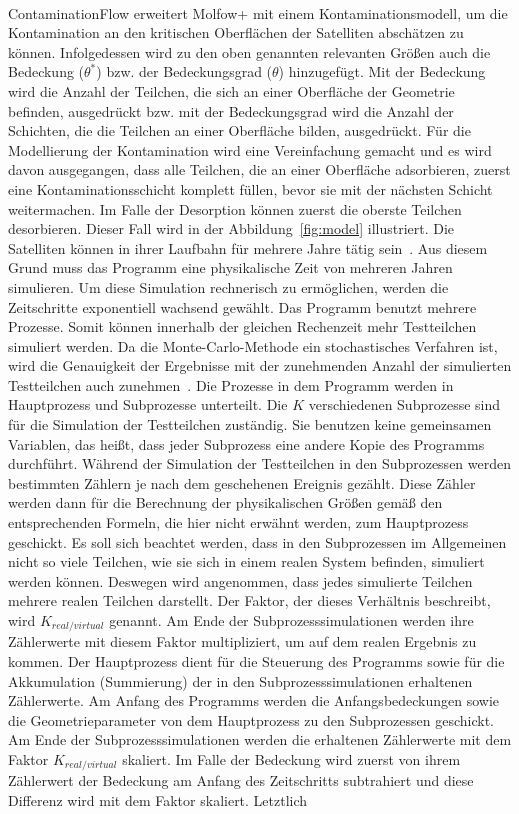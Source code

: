 \documentclass{listhesis}
\begin{document}
\paragraph{}
ContaminationFlow erweitert Molfow+ mit einem Kontaminationsmodell, um die Kontamination an den kritischen Oberflächen der Satelliten abschätzen zu können. Infolgedessen wird zu den oben genannten relevanten Größen auch die Bedeckung ($\theta^*$) bzw. der Bedeckungsgrad ($\theta$) hinzugefügt. Mit der Bedeckung wird die Anzahl der Teilchen, die sich an einer Oberfläche der Geometrie befinden, ausgedrückt bzw. mit der Bedeckungsgrad wird die Anzahl der Schichten, die die Teilchen an einer Oberfläche bilden, ausgedrückt. Für die Modellierung der Kontamination wird eine Vereinfachung gemacht und es wird davon ausgegangen, dass alle Teilchen, die an einer Oberfläche adsorbieren, zuerst eine Kontaminationsschicht komplett füllen, bevor sie mit der nächsten Schicht weitermachen. Im Falle der Desorption können zuerst die oberste Teilchen desorbieren. Dieser Fall wird in der Abbildung~\ref{fig:model} illustriert. Die Satelliten können in ihrer Laufbahn für mehrere Jahre tätig sein~\cite{jiao}. Aus diesem Grund muss das Programm eine physikalische Zeit von mehreren Jahren simulieren. Um diese Simulation rechnerisch zu ermöglichen, werden die Zeitschritte exponentiell wachsend gewählt. Das Programm benutzt mehrere Prozesse. Somit können innerhalb der gleichen Rechenzeit mehr Testteilchen simuliert werden. Da die Monte-Carlo-Methode ein stochastisches Verfahren ist, wird die Genauigkeit der Ergebnisse mit der zunehmenden Anzahl der simulierten Testteilchen auch zunehmen~\cite{fenrg}. Die Prozesse in dem Programm werden in Hauptprozess und Subprozesse unterteilt. Die $K$ verschiedenen Subprozesse sind für die Simulation der Testteilchen zuständig. Sie benutzen keine gemeinsamen Variablen, das heißt, dass jeder Subprozess eine andere Kopie des Programms durchführt. Während der Simulation der Testteilchen in den Subprozessen werden bestimmten Zählern je nach dem geschehenen Ereignis gezählt. Diese Zähler werden dann für die Berechnung der physikalischen Größen gemäß den entsprechenden Formeln, die hier nicht erwähnt werden, zum Hauptprozess geschickt. Es soll sich beachtet werden, dass in den Subprozessen im Allgemeinen nicht so viele Teilchen, wie sie sich in einem realen System befinden, simuliert werden können. Deswegen wird angenommen, dass jedes simulierte Teilchen mehrere realen Teilchen darstellt. Der Faktor, der dieses Verhältnis beschreibt, wird $K_{real/virtual}$ genannt. Am Ende der Subprozesssimulationen werden ihre Zählerwerte mit diesem Faktor multipliziert, um auf dem realen Ergebnis zu kommen. Der Hauptprozess dient für die Steuerung des Programms sowie für die Akkumulation (Summierung) der in den Subprozesssimulationen erhaltenen Zählerwerte. Am Anfang des Programms werden die Anfangsbedeckungen sowie die Geometrieparameter von dem Hauptprozess zu den Subprozessen geschickt. Am Ende der Subprozesssimulationen werden die erhaltenen Zählerwerte mit dem Faktor $K_{real/virtual}$ skaliert. Im Falle der Bedeckung wird zuerst von ihrem Zählerwert der Bedeckung am Anfang des Zeitschritts subtrahiert und diese Differenz wird mit dem Faktor skaliert. Letztlich 
\end{document}
